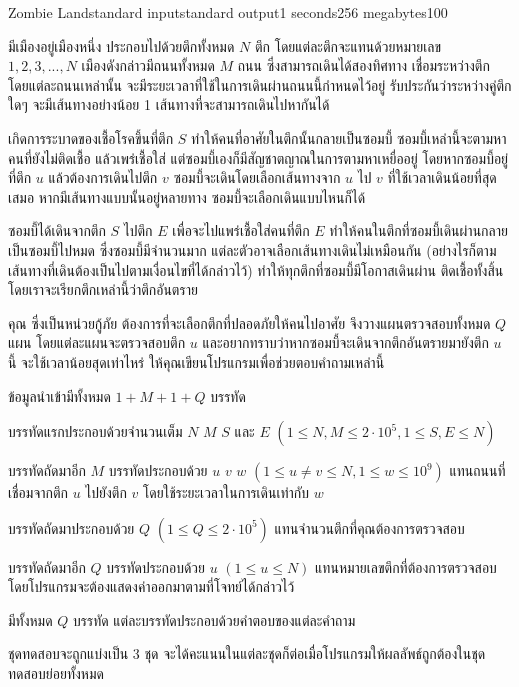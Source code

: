 \documentclass[11pt,a4paper]{article}
\begin{document}
\begin{problem}{Zombie Land}{standard input}{standard output}{1 seconds}{256 megabytes}{100}

มีเมืองอยู่เมืองหนึ่ง ประกอบไปด้วยตึกทั้งหมด $N$ ตึก โดยแต่ละตึกจะแทนด้วยหมายเลข $1, 2, 3, ..., N$  เมืองดังกล่าวมีถนนทั้งหมด $M$ ถนน ซึ่งสามารถเดินได้สองทิศทาง เชื่อมระหว่างตึก โดยแต่ละถนนเหล่านั้น จะมีระยะเวลาที่ใช้ในการเดินผ่านถนนนี้กำหนดไว้อยู่ รับประกันว่าระหว่างคู่ตึกใดๆ จะมีเส้นทางอย่างน้อย 1 เส้นทางที่จะสามารถเดินไปหากันได้

เกิดการระบาดของเชื้อโรคขึ้นที่ตึก $S$ ทำให้คนที่อาศัยในตึกนั้นกลายเป็นซอมบี้ ซอมบี้เหล่านี้จะตามหาคนที่ยังไม่ติดเชื้อ แล้วเพร่เชื้อใส่ แต่ซอมบี้เองก็มีสัญชาตญาณในการตามหาเหยื่ออยู่ โดยหากซอมบี้อยู่ที่ตึก $u$ แล้วต้องการเดินไปตึก $v$ ซอมบี้จะเดินโดยเลือกเส้นทางจาก $u$ ไป $v$ ที่ใช้เวลาเดินน้อยที่สุดเสมอ หากมีเส้นทางแบบนั้นอยู่หลายทาง ซอมบี้จะเลือกเดินแบบไหนก็ได้

ซอมบี้ได้เดินจากตึก $S$ ไปตึก $E$ เพื่อจะไปแพร่เชื้อใส่คนที่ตึก $E$ ทำให้คนในตึกที่ซอมบี้เดินผ่านกลายเป็นซอมบี้ไปหมด ซึ่งซอมบี้มีจำนวนมาก แต่ละตัวอาจเลือกเส้นทางเดินไม่เหมือนกัน (อย่างไรก็ตาม เส้นทางที่เดินต้องเป็นไปตามเงื่อนไขที่ได้กล่าวไว้) ทำให้ทุกตึกที่ซอมบี้มีโอกาสเดินผ่าน ติดเชื้อทั้งสิ้น โดยเราจะเรียกตึกเหล่านี้ว่าตึกอันตราย

คุณ ซึ่งเป็นหน่วยกู้ภัย ต้องการที่จะเลือกตึกที่ปลอดภัยให้คนไปอาศัย จึงวางแผนตรวจสอบทั้งหมด $Q$ แผน โดยแต่ละแผนจะตรวจสอบตึก $u$ และอยากทราบว่าหากซอมบี้จะเดินจากตึกอันตรายมายังตึก $u$ นี้ จะใช้เวลาน้อยสุดเท่าไหร่ ให้คุณเขียนโปรแกรมเพื่อช่วยตอบคำถามเหล่านี้

\InputFile
ข้อมูลนำเข้ามีทั้งหมด $1 + M + 1 + Q$ บรรทัด

บรรทัดแรกประกอบด้วยจำนวนเต็ม $N$ $M$ $S$ และ $E$ $(1 \leq N, M \leq 2 \cdot 10^5, 1 \leq S, E \leq N)$ 

บรรทัดถัดมาอีก $M$ บรรทัดประกอบด้วย $u$ $v$ $w$ $(1 \leq u \neq v \leq N, 1 \leq w \leq 10^9)$ แทนถนนที่เชื่อมจากตึก $u$ ไปยังตึก $v$ โดยใช้ระยะเวลาในการเดินเท่ากับ $w$

บรรทัดถัดมาประกอบด้วย $Q$ $(1 \leq Q \leq 2 \cdot 10^5)$ แทนจำนวนตึกที่คุณต้องการตรวจสอบ

บรรทัดถัดมาอีก $Q$ บรรทัดประกอบด้วย $u$ $(1 \leq u \leq N)$ แทนหมายเลขตึกที่ต้องการตรวจสอบ โดยโปรแกรมจะต้องแสดงค่าออกมาตามที่โจทย์ได้กล่าวไว้

\OutputFile
มีทั้งหมด $Q$ บรรทัด แต่ละบรรทัดประกอบด้วยคำตอบของแต่ละคำถาม

\Scoring
ชุดทดสอบจะถูกแบ่งเป็น 3 ชุด จะได้คะแนนในแต่ละชุดก็ต่อเมื่อโปรแกรมให้ผลลัพธ์ถูกต้องในชุดทดสอบย่อยทั้งหมด


\end{problem}
\end{document}
